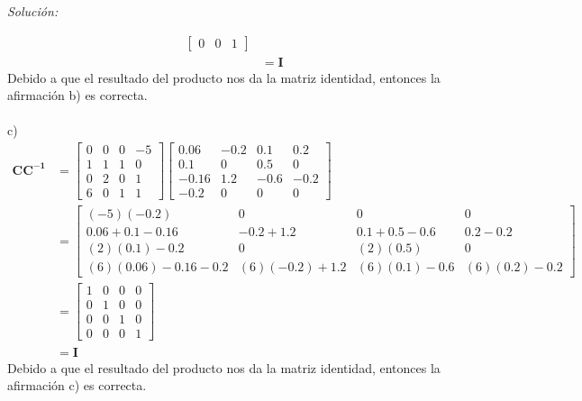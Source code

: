 \documentclass[12pt]{article}
\newenvironment{sol}
    {\emph{Solución:}
    }
    {
    }
\begin{document}
\begin{sol}
\begin{align*}
\begin{bmatrix}
0 & 0 & 1
\end{bmatrix}\\
&= \mathbf{I}
\end{align*}
Debido a que el resultado del producto nos da la matriz identidad, entonces la afirmación b) es correcta. \\ \\ 
c)
\begin{align*}
\mathbf{CC^{-1}} &= 
\begin{bmatrix}
0&0&0&-5\\
1&1&1&0\\
0&2&0&1\\
6&0&1&1
\end{bmatrix}
\begin{bmatrix}
0.06 & -0.2 & 0.1 & 0.2\\
0.1 & 0 & 0.5&0\\
-0.16 & 1.2 & -0.6 & -0.2 \\
-0.2 & 0 & 0 & 0
\end{bmatrix} \\
&= 
\begin{bmatrix}
(-5)(-0.2) & 0 & 0 & 0 \\
0.06 + 0.1 -0.16 & -0.2 +  1.2  & 0.1 + 0.5 -0.6 & 0.2 -0.2  \\
(2)(0.1) -0.2 & 0 &  (2)(0.5) & 0 \\
(6)(0.06) -0.16 -0.2 & (6)(-0.2) +  1.2  & (6)(0.1) -0.6 & (6)(0.2) -0.2 
\end{bmatrix} \\
&=
\begin{bmatrix}
1 & 0 & 0 & 0 \\
0 & 1 & 0 & 0 \\
0 & 0 & 1 & 0 \\
0 & 0 & 0 & 1
\end{bmatrix}\\
&= \mathbf{I}
\end{align*}
Debido a que el resultado del producto nos da la matriz identidad, entonces la afirmación c) es correcta. \\ \\ 
\end{sol}

\pagebreak
\end{document}
